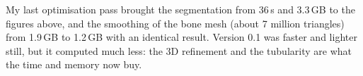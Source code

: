 My last optimisation pass brought the segmentation from 36\,s and 3.3\,GB to the figures above, and the
smoothing of the bone mesh (about 7 million triangles) from 1.9\,GB to 1.2\,GB with an identical result.
Version 0.1 was faster and lighter still, but it computed much less: the 3D refinement and the
tubularity are what the time and memory now buy.
